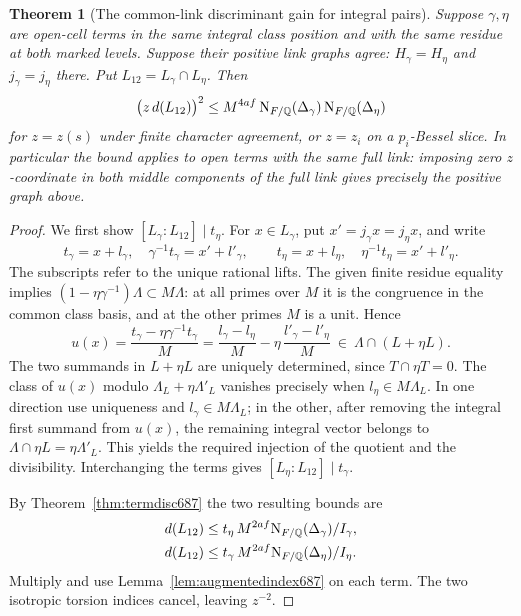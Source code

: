 \documentclass[a4paper,11pt]{article}
\newtheorem{theorem}[proposition]{Theorem}
\theoremstyle{definition}
\theoremstyle{remark}
\numberwithin{equation}{section}
\begin{document}
\begin{theorem}[The common-link discriminant gain for integral pairs]
\leavevmode\label{thm:samelink687}
Suppose \(\gamma,\eta\) are open-cell terms in the same integral
class position and with the same residue at both marked levels.
Suppose their positive link graphs agree: \(H_\gamma=H_\eta\)
and \(j_\gamma=j_\eta\) there. Put \(L_{12}=L_\gamma\cap L_\eta\).
Then
\[
 \big(z\,d(L_{12})\big)^2
    \le M^{4af}\,
       {\rm N}_{F/\mathbb Q}(\Delta_\gamma)\,
       {\rm N}_{F/\mathbb Q}(\Delta_\eta)
\]
for \(z=z(s)\) under finite character agreement, or \(z=z_i\)
on a \(p_i\)-Bessel slice. In particular the bound applies to
open terms with the same full link: imposing zero \(z\)-coordinate
in both middle components of the full link gives precisely
the positive graph above.
\end{theorem}
\begin{proof}
We first show \([L_\gamma:L_{12}]\mid t_\eta\). For
\(x\in L_\gamma\), put \(x'=j_\gamma x=j_\eta x\), and write
\[
 t_\gamma=x+l_\gamma,\quad \gamma^{-1}t_\gamma=x'+l'_\gamma,
 \qquad
 t_\eta=x+l_\eta,\quad \eta^{-1}t_\eta=x'+l'_\eta .
\]
The subscripts refer to the unique rational lifts. The given
finite residue equality implies
\((1-\eta\gamma^{-1})\Lambda\subset M\Lambda\):
at all primes over \(M\) it is the congruence in the common
class basis, and at the other primes \(M\) is a unit. Hence
\[
  u(x)=\frac{t_\gamma-\eta\gamma^{-1}t_\gamma}{M}
       =\frac{l_\gamma-l_\eta}{M}
          -\eta\,\frac{l'_\gamma-l'_\eta}{M}
              \ \in\ \Lambda\cap(L+\eta L).
\]
The two summands in \(L+\eta L\) are uniquely determined, since
\(T\cap\eta T=0\). The class of \(u(x)\) modulo
\(\Lambda_L+\eta\Lambda'_L\) vanishes precisely when
\(l_\eta\in M\Lambda_L\). In one direction use uniqueness and
\(l_\gamma\in M\Lambda_L\); in the other, after removing the
integral first summand from \(u(x)\), the remaining integral
vector belongs to \(\Lambda\cap\eta L=\eta\Lambda'_L\).
This yields the required injection of the quotient and the
divisibility. Interchanging the terms gives
\([L_\eta:L_{12}]\mid t_\gamma\).

By Theorem~\ref{thm:termdisc687} the two resulting bounds are
\[
 \begin{split}
 d(L_{12})&\le t_\eta\,M^{2af}
                   {\rm N}_{F/\mathbb Q}(\Delta_\gamma)/I_\gamma,\\
 d(L_{12})&\le t_\gamma\,M^{2af}
                   {\rm N}_{F/\mathbb Q}(\Delta_\eta)/I_\eta .
 \end{split}
\]
Multiply and use Lemma~\ref{lem:augmentedindex687} on each term.
The two isotropic torsion indices cancel, leaving \(z^{-2}\).
\end{proof}
\end{document}
